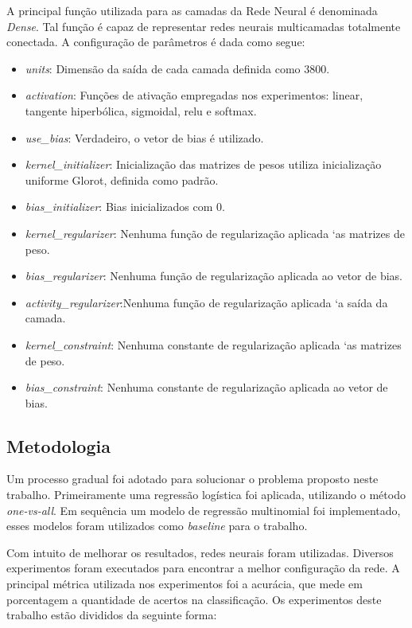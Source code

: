 \documentclass[conference]{IEEEtran}
\begin{document}
A principal função utilizada para as camadas da Rede Neural é denominada \textit{Dense}. Tal função é capaz de representar redes neurais multicamadas totalmente conectada. A configuração de parâmetros é dada como segue:
\begin{itemize}
	\item \textit{units}: Dimensão da saída de cada camada definida como $3800$.
	\item \textit{activation}: Funções de ativação empregadas nos experimentos: linear, tangente hiperbólica, sigmoidal, relu e softmax. 
	\item \textit{use\_bias}: Verdadeiro, o vetor de bias é utilizado.
	\item \textit{kernel\_initializer}: Inicialização das matrizes de pesos utiliza inicialização uniforme Glorot, definida como padrão.
	\item \textit{bias\_initializer}: Bias inicializados com $0$.
	\item \textit{kernel\_regularizer}: Nenhuma função de regularização aplicada `as matrizes de peso.
	\item \textit{bias\_regularizer}: Nenhuma função de regularização aplicada ao vetor de bias.
	\item \textit{activity\_regularizer}:Nenhuma função de regularização aplicada `a saída da camada.
	\item \textit{kernel\_constraint}: Nenhuma constante de regularização aplicada `as matrizes de peso.
	\item \textit{bias\_constraint}: Nenhuma constante de regularização aplicada ao vetor de bias.
\end{itemize}

\subsection{Metodologia} \label{sec:met}

Um processo gradual foi adotado para solucionar o problema proposto neste trabalho. Primeiramente uma regressão logística foi aplicada, utilizando o método \emph{one-vs-all}. Em sequência um modelo de regressão multinomial foi implementado, esses modelos foram utilizados como \emph{baseline} para o trabalho.

Com intuito de melhorar os resultados, redes neurais foram utilizadas. Diversos experimentos foram executados para encontrar a melhor configuração da rede. A principal métrica utilizada nos experimentos foi a acurácia, que mede em porcentagem a quantidade de acertos na classificação. Os experimentos deste trabalho estão divididos da seguinte forma: 
\end{document}

